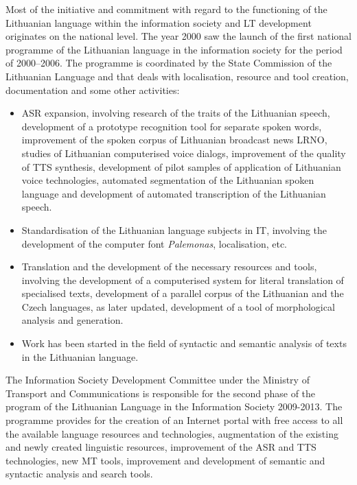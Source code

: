 \begin{multicols}{2}
Most of the initiative and commitment with regard to the functioning of the Lithuanian language within the information society and LT development originates on the national level. The year 2000 saw the launch of the first national programme of the Lithuanian language in the information society for the period of 2000–2006. The programme is coordinated by the State Commission of the Lithuanian Language and that deals with localisation, resource and tool creation, documentation and some other activities:
\begin{itemize}
      \item ASR expansion, involving research of the traits of the Lithuanian speech, development of a prototype recognition tool for separate spoken words, improvement of the spoken corpus of Lithuanian broadcast news LRNO, studies of Lithuanian computerised voice dialogs, improvement of the quality of TTS synthesis, development of pilot samples of application of Lithuanian voice technologies, automated segmentation of the Lithuanian spoken language and development of automated transcription of the Lithuanian speech.
      \item Standardisation of the Lithuanian language subjects in IT, involving the development of the computer font \textit{Palemonas}, localisation, etc.
      \item Translation and the development of the necessary resources and tools, involving the development of a computerised system for literal translation of specialised texts, development of a parallel corpus of the Lithuanian and the Czech languages, as later updated, development of a tool of morphological analysis and generation.
      \item Work has been started in the field of syntactic and semantic analysis of texts in the Lithuanian language. 
          \end{itemize}

    The Information Society Development Committee under the Ministry of Transport and Communications is responsible for the second phase of the program of the Lithuanian Language in the Information Society 2009-2013. The programme provides for the creation of an Internet portal with free access to all the available language resources and technologies, augmentation of the existing and newly created linguistic resources, improvement of the ASR and TTS technologies, new MT tools, improvement and development of semantic and syntactic analysis and search tools.


\end{multicols}
